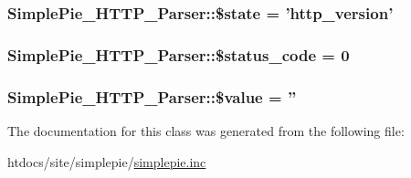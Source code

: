 \hypertarget{class_simple_pie___h_t_t_p___parser_a196016b4fc9dce8ac9afd5b50fcd2a68}{
\subsubsection[{\$state}]{\setlength{\rightskip}{0pt plus 5cm}Simple\-Pie\-\_\-\-H\-T\-T\-P\-\_\-\-Parser\-::\$state = '{\bf http\-\_\-version}'}}\label{class_simple_pie___h_t_t_p___parser_a196016b4fc9dce8ac9afd5b50fcd2a68}
\hypertarget{class_simple_pie___h_t_t_p___parser_a6ab7c4a2d449549de3a1f528a070a9a5}{
\subsubsection[{\$status\-\_\-code}]{\setlength{\rightskip}{0pt plus 5cm}Simple\-Pie\-\_\-\-H\-T\-T\-P\-\_\-\-Parser\-::\$status\-\_\-code = 0}}\label{class_simple_pie___h_t_t_p___parser_a6ab7c4a2d449549de3a1f528a070a9a5}
\hypertarget{class_simple_pie___h_t_t_p___parser_af343e7323f9cd63bf2bf00677cde6ae2}{
\subsubsection[{\$value}]{\setlength{\rightskip}{0pt plus 5cm}Simple\-Pie\-\_\-\-H\-T\-T\-P\-\_\-\-Parser\-::\$value = ''}}\label{class_simple_pie___h_t_t_p___parser_af343e7323f9cd63bf2bf00677cde6ae2}


The documentation for this class was generated from the following file\-:\begin{DoxyCompactItemize}
\item 
htdocs/site/simplepie/\hyperlink{simplepie_8inc}{simplepie.\-inc}\end{DoxyCompactItemize}
